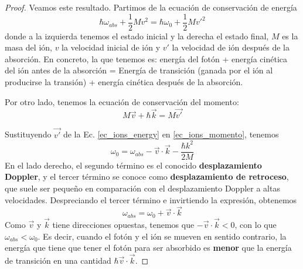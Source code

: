    \begin{proof}
        Veamos este resultado. Partimos de la ecuación de conservación de energía 
        	\begin{equation} \label{ec_ions_energy}
        	\hbar \omega_{abs} + \frac{1}{2} M v^2 = \hbar \omega_0 + \frac{1}{2}M{v'}^2
        	\end{equation}
        donde a la izquierda tenemos el estado inicial y la derecha el estado final, $M$ es la masa del ión, $v$ la velocidad inicial de ión y $v'$ la velocidad de ión después de la absorción. En concreto, la que tenemos es: energía del fotón + energía cinética del ión antes de la absorción = Energía de transición (ganada por el ión al producirse la transión) + energía cinética después de la absorción.
        
        Por otro lado, tenemos la ecuación de conservación del momento:
        	\begin{equation} \label{ec_ions_momento}
        	M \vec{v} + \hbar \vec{k} = M \vec{v'}
        	\end{equation}
        
        Sustituyendo $\vec{v'}$ de la Ec. \ref{ec_ions_energy} en \ref{ec_ions_momento}, tenemos
        	\begin{equation}
        	\omega_0 = \omega_{abs} - \vec{v} \cdot \vec{k} - \frac{\hbar k^2}{2M}
        	\end{equation}
        En el lado derecho, el segundo término es el conocido \textbf{desplazamiento Doppler}, y el tercer término se conoce como \textbf{desplazamiento de retroceso}, que suele ser pequeño en comparación con el desplazamiento Doppler a altas velocidades. Despreciando el tercer término e invirtiendo la expresión, obtenemos
        	\begin{equation}
        	\omega_{abs} = \omega_0 + \vec{v} \cdot \vec{k}
        	\end{equation}
        Como $\vec{v}$ y $\vec{k}$ tiene direcciones opuestas, tenemos que $-\vec{v} \cdot \vec{k} <0$, con lo que $\omega_{abs} < \omega_0$. Es decir, cuando el fotón y el ión se mueven en sentido contrario, la energía que tiene que tener el fotón para ser absorbido es \textbf{menor}  que la energía de transición en una cantidad $\hbar \vec{v} \cdot \vec{k}$. 
        

\end{proof}
